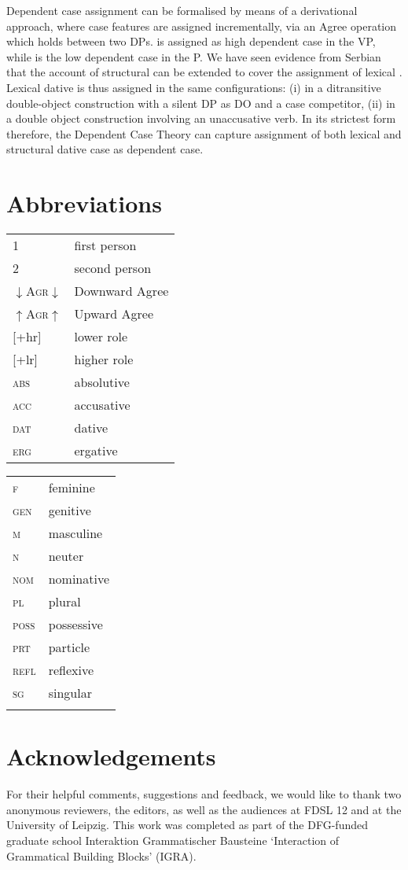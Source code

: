 \documentclass[output=paper,
modfonts,
newtxmath,
hidelinks
]{langscibook}
\begin{document}
Dependent case assignment can be formalised by means of a derivational approach, where case features are assigned incrementally, via an Agree operation which holds between two DPs. \datt{} is assigned as high dependent case in the VP, while \accc{} is the low dependent case in the \littlev{}P. We have seen evidence from Serbian that the account of structural \datt{} can be extended to cover the assignment of lexical \datt. Lexical dative is thus assigned in the same configurations: (i) in a ditransitive double-object construction with a silent DP as DO and a case competitor, (ii) in a double object construction involving an unaccusative verb. In its strictest form therefore, the Dependent Case Theory can capture assignment of both lexical and structural dative case as dependent case.

\section*{Abbreviations}

\begin{tabularx}{.5\textwidth}{@{}lQ@{}}
1& first person\\
2& second person\\
{$\downarrow$\textsc{Agr}$\downarrow$}&Downward Agree\\
{$\uparrow$\textsc{Agr}$\uparrow$}&Upward Agree\\
{[+hr]}&lower role\\
{[+lr]}&higher role\\
\textsc{abs}&absolutive\\
\textsc{acc}&accusative\\
\textsc{dat}&dative\\
\textsc{erg}&ergative\\
\end{tabularx}%
\begin{tabularx}{.5\textwidth}{@{}lQ@{}}
\textsc{f}&feminine\\
\textsc{gen}&genitive\\
\textsc{m}&masculine\\
\textsc{n}&neuter\\
\textsc{nom}&nominative\\
\textsc{pl}&plural\\
\textsc{poss}&possessive\\
\textsc{prt}&particle\\
\textsc{refl}&reflexive\\
\textsc{sg}&singular\\
&\\
\end{tabularx} 


\section*{Acknowledgements}
For their helpful comments, suggestions and feedback, we would like to thank two anonymous reviewers, the editors, as well as the audiences at FDSL 12 and at the University of Leipzig. This work was completed as part of the DFG-funded graduate school Interaktion Grammatischer Bausteine `Interaction of Grammatical Building Blocks' (IGRA).

\sloppy
\printbibliography[heading=subbibliography,notkeyword=this]
\end{document}
